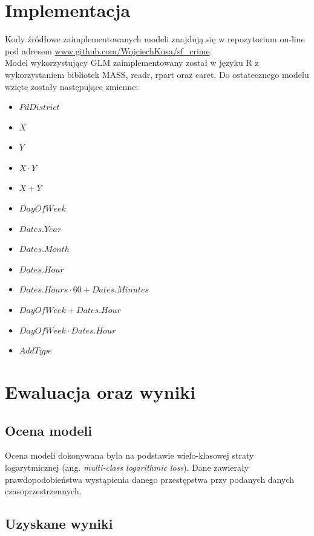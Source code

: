 \documentclass[11pt]{article} %
\begin{document}
\section{Implementacja}

Kody źródłowe zaimplementowanych modeli znajdują się w repozytorium on-line pod adresem \url{www.github.com/WojciechKusa/sf_crime}. \\

Model wykorzystujący GLM zaimplementowany został w języku R z wykorzystaniem bibliotek MASS, readr, rpart oraz caret. Do ostatecznego modelu wzięte zostały następujące zmienne:

\begin{itemize}
\item $PdDistrict$

\item $X $
\item $Y $
\item $X \cdot Y$
\item $X + Y$ 
\item $DayOfWeek$
\item $Dates.Year $
\item $Dates.Month $
\item $Dates.Hour $
\item $Dates.Hours \cdot 60 + Dates.Minutes$ 
\item $DayOfWeek + Dates.Hour $
\item $DayOfWeek \cdot Dates.Hour $

\item $AddType $

\end{itemize}



\section{Ewaluacja oraz wyniki}

\subsection{Ocena modeli}

Ocena modeli dokonywana była na podstawie wielo-klasowej straty logarytmicznej (ang. \textit{multi-class logarithmic loss}). Dane zawierały prawdopodobieństwa wystąpienia danego przestępstwa przy podanych danych czasoprzestrzennych. \\

\subsection{Uzyskane wyniki}
\end{document}
